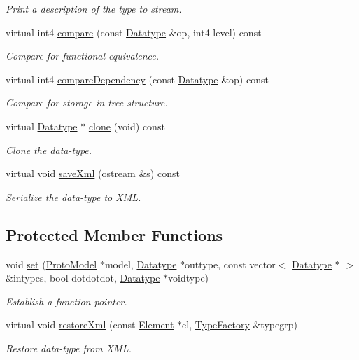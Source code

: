 \begin{DoxyCompactItemize}
\begin{DoxyCompactList}\small\item\em Print a description of the type to stream. \end{DoxyCompactList}\item 
virtual int4 \mbox{\hyperlink{class_type_code_a96f56d57d3c88430321564e01dc1ad90}{compare}} (const \mbox{\hyperlink{class_datatype}{Datatype}} \&op, int4 level) const
\begin{DoxyCompactList}\small\item\em Compare for functional equivalence. \end{DoxyCompactList}\item 
virtual int4 \mbox{\hyperlink{class_type_code_a486209b2c4c2efe517f9b5e6a566592e}{compare\+Dependency}} (const \mbox{\hyperlink{class_datatype}{Datatype}} \&op) const
\begin{DoxyCompactList}\small\item\em Compare for storage in tree structure. \end{DoxyCompactList}\item 
virtual \mbox{\hyperlink{class_datatype}{Datatype}} $\ast$ \mbox{\hyperlink{class_type_code_a450e2f5f2cd4a4573573da9a20e4d2fa}{clone}} (void) const
\begin{DoxyCompactList}\small\item\em Clone the data-\/type. \end{DoxyCompactList}\item 
virtual void \mbox{\hyperlink{class_type_code_a6d47db2c7cf2a968b49cbac59de182d7}{save\+Xml}} (ostream \&s) const
\begin{DoxyCompactList}\small\item\em Serialize the data-\/type to X\+ML. \end{DoxyCompactList}\end{DoxyCompactItemize}
\subsection*{Protected Member Functions}
\begin{DoxyCompactItemize}
\item 
void \mbox{\hyperlink{class_type_code_a6f6acdba3bf4b363ffaf4b71501970a5}{set}} (\mbox{\hyperlink{class_proto_model}{Proto\+Model}} $\ast$model, \mbox{\hyperlink{class_datatype}{Datatype}} $\ast$outtype, const vector$<$ \mbox{\hyperlink{class_datatype}{Datatype}} $\ast$ $>$ \&intypes, bool dotdotdot, \mbox{\hyperlink{class_datatype}{Datatype}} $\ast$voidtype)
\begin{DoxyCompactList}\small\item\em Establish a function pointer. \end{DoxyCompactList}\item 
virtual void \mbox{\hyperlink{class_type_code_a8b721a26b30c296fe2510738601e3333}{restore\+Xml}} (const \mbox{\hyperlink{class_element}{Element}} $\ast$el, \mbox{\hyperlink{class_type_factory}{Type\+Factory}} \&typegrp)
\begin{DoxyCompactList}\small\item\em Restore data-\/type from X\+ML. \end{DoxyCompactList}\end{DoxyCompactItemize}
